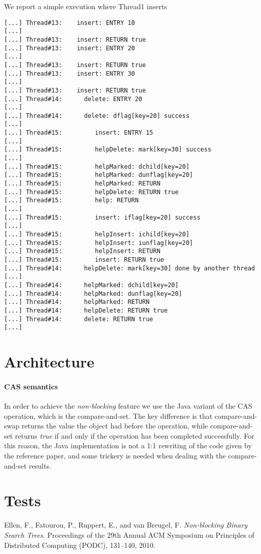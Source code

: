 \documentclass[a4paper,draft,12pt]{article}
\begin{document}
We report a simple execution where Thread1 inserts
\begin{verbatim}
[...] Thread#13:    insert: ENTRY 10
[...]
[...] Thread#13:    insert: RETURN true
[...] Thread#13:    insert: ENTRY 20
[...]
[...] Thread#13:    insert: RETURN true
[...] Thread#13:    insert: ENTRY 30
[...]
[...] Thread#13:    insert: RETURN true
[...] Thread#14:      delete: ENTRY 20
[...]
[...] Thread#14:      delete: dflag[key=20] success
[...]
[...] Thread#15:         insert: ENTRY 15
[...]
[...] Thread#15:         helpDelete: mark[key=30] success
[...]
[...] Thread#15:         helpMarked: dchild[key=20]
[...] Thread#15:         helpMarked: dunflag[key=20]
[...] Thread#15:         helpMarked: RETURN
[...] Thread#15:         helpDelete: RETURN true
[...] Thread#15:         help: RETURN
[...]
[...] Thread#15:         insert: iflag[key=20] success
[...]
[...] Thread#15:         helpInsert: ichild[key=20]
[...] Thread#15:         helpInsert: iunflag[key=20]
[...] Thread#15:         helpInsert: RETURN
[...] Thread#15:         insert: RETURN true
[...] Thread#14:      helpDelete: mark[key=30] done by another thread
[...]
[...] Thread#14:      helpMarked: dchild[key=20]
[...] Thread#14:      helpMarked: dunflag[key=20]
[...] Thread#14:      helpMarked: RETURN
[...] Thread#14:      helpDelete: RETURN true
[...] Thread#14:      delete: RETURN true
[...]
\end{verbatim}




\section{Architecture} %
\label{sec:architecture}

\paragraph{CAS semantics}
In order to achieve the \emph{non-blocking} feature we use the Java variant of the \ac{CAS} operation, which is the compare-and-set.
The key difference is that compare-and-swap returns the value the object had before the operation, while compare-and-set returns \emph{true} if and only if the operation has been completed successfully.
For this reason, the Java implementation is not a 1:1 rewriting of the code given by the reference paper, and some trickery is needed when dealing with the compare-and-set results.

\section{Tests} %
\label{sec:tests}



\begin{thebibliography}{9}
     Ellen, F., Fatourou, P., Ruppert, E., and van Breugel, F. \emph{Non-blocking Binary Search Trees}. Proceedings of the 29th Annual ACM Symposium on Principles of Distributed Computing (PODC), 131–140, 2010.
\end{thebibliography}
\end{document}
